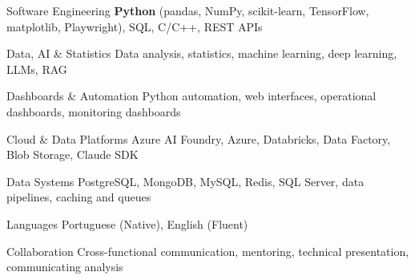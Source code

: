\begin{cvskills}

  \cvskill
    {Software Engineering}
    {\textbf{Python} (pandas, NumPy, scikit-learn, TensorFlow, matplotlib, Playwright), SQL, C/C++, REST APIs}

  \cvskill
    {Data, AI \& Statistics}
    {Data analysis, statistics, machine learning, deep learning, LLMs, RAG}

  \cvskill
    {Dashboards \& Automation}
    {Python automation, web interfaces, operational dashboards, monitoring dashboards}

  \cvskill
    {Cloud \& Data Platforms}
    {Azure AI Foundry, Azure, Databricks, Data Factory, Blob Storage, Claude SDK}

  \cvskill
    {Data Systems}
    {PostgreSQL, MongoDB, MySQL, Redis, SQL Server, data pipelines, caching and queues}

  \cvskill
    {Languages}
    {Portuguese (Native), English (Fluent)}

  \cvskill
    {Collaboration}
    {Cross-functional communication, mentoring, technical presentation, communicating analysis}
\end{cvskills}
